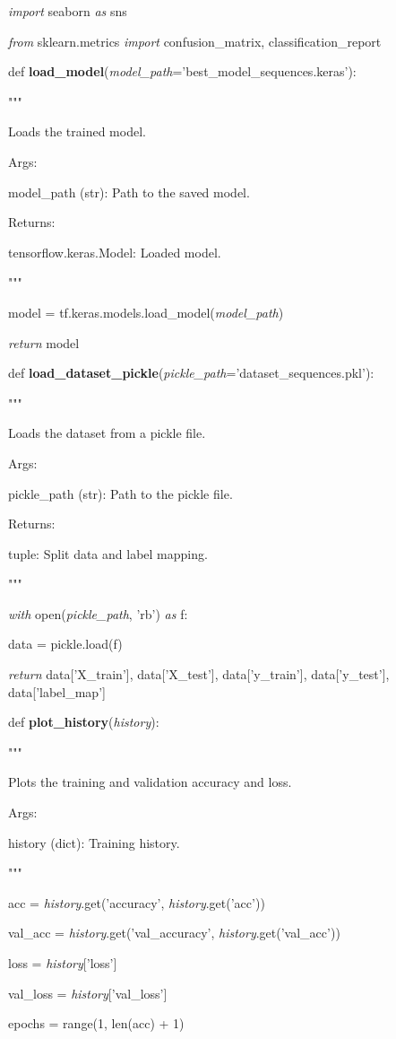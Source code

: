 \documentclass[
]{article}
\begin{document}
\emph{import} seaborn \emph{as} sns

\emph{from} sklearn.metrics \emph{import} confusion\_matrix, classification\_report

def \textbf{load\_model}(\emph{model\_path}='best\_model\_sequences.keras'):

"""

Loads the trained model.

Args:

model\_path (str): Path to the saved model.

Returns:

tensorflow.keras.Model: Loaded model.

"""

model = tf.keras.models.load\_model(\emph{model\_path})

\emph{return} model

def \textbf{load\_dataset\_pickle}(\emph{pickle\_path}='dataset\_sequences.pkl'):

"""

Loads the dataset from a pickle file.

Args:

pickle\_path (str): Path to the pickle file.

Returns:

tuple: Split data and label mapping.

"""

\emph{with} open(\emph{pickle\_path}, 'rb') \emph{as} f:

data = pickle.load(f)

\emph{return} data{[}'X\_train'{]}, data{[}'X\_test'{]}, data{[}'y\_train'{]}, data{[}'y\_test'{]}, data{[}'label\_map'{]}

def \textbf{plot\_history}(\emph{history}):

"""

Plots the training and validation accuracy and loss.

Args:

history (dict): Training history.

"""

acc = \emph{history}.get('accuracy', \emph{history}.get('acc'))

val\_acc = \emph{history}.get('val\_accuracy', \emph{history}.get('val\_acc'))

loss = \emph{history}{[}'loss'{]}

val\_loss = \emph{history}{[}'val\_loss'{]}

epochs = range(1, len(acc) + 1)
\end{document}
